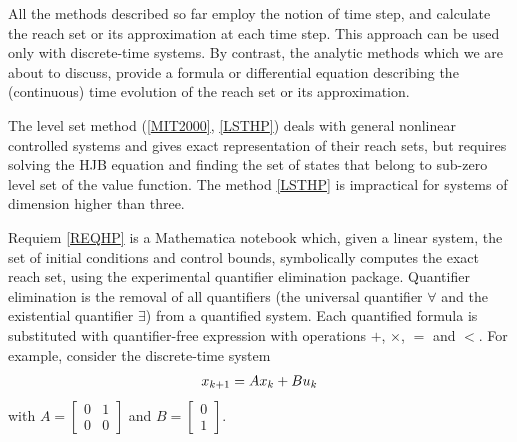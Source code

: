 \documentclass[letterpaper,10pt,english]{sphinxmanual}
\begin{document}
All the methods described so far employ the notion of time step, and
calculate the reach set or its approximation at each time step. This
approach can be used only with discrete-time systems. By contrast, the
analytic methods which we are about to discuss, provide a formula or
differential equation describing the (continuous) time evolution of the
reach set or its approximation.

The level set method ({\hyperref[chap_intro:mit2000]{{[}MIT2000{]}}}, {\hyperref[chap_intro:lsthp]{{[}LSTHP{]}}})
deals with general nonlinear controlled systems and gives
exact representation of their reach sets, but requires solving the HJB
equation and finding the set of states that belong to sub-zero level set
of the value function. The method {\hyperref[chap_intro:lsthp]{{[}LSTHP{]}}} is
impractical for systems of dimension higher than three.

Requiem {\hyperref[chap_intro:reqhp]{{[}REQHP{]}}} is a Mathematica notebook which, given a
linear system, the set of initial conditions and control bounds,
symbolically computes the exact reach set, using the experimental
quantifier elimination package. Quantifier elimination is the removal of
all quantifiers (the universal quantifier \(\forall\) and the
existential quantifier \(\exists\)) from a quantified system. Each
quantified formula is substituted with quantifier-free expression with
operations \(+\), \(\times\), \(=\) and \(<\). For
example, consider the discrete-time system
\begin{gather}
\begin{split}x_{k+1} = Ax_k + Bu_k\end{split}\notag
\end{gather}
with \(A=\left[\begin{array}{cc}0 & 1\\0 & 0\end{array}\right]\)
and \(B=\left[\begin{array}{c}0\\1\end{array}\right]\).
\end{document}
